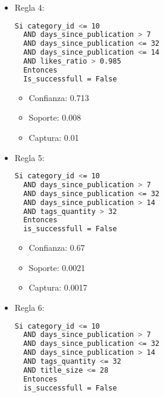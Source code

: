 \begin{itemize}

  \item Regla 4:

\begin{lstlisting}[language=bash, numbers=none]
  Si category_id <= 10
  AND days_since_publication > 7
  AND days_since_publication <= 32
  AND days_since_publication <= 14
  AND likes_ratio > 0.985
  Entonces
  Is_successfull = False
\end{lstlisting}

    \begin{itemize}
      \item Confianza: 0.713
      \item Soporte: 0.008
      \item Captura: 0.01
    \end{itemize}

  \item Regla 5:

\begin{lstlisting}[language=bash, numbers=none]
  Si category_id <= 10
  AND days_since_publication > 7
  AND days_since_publication <= 32
  AND days_since_publication > 14
  AND tags_quantity > 32
  Entonces
  is_successfull = False
\end{lstlisting}

    \begin{itemize}
      \item Confianza: 0.67
      \item Soporte: 0.0021
      \item Captura: 0.0017
    \end{itemize}

  \item Regla 6:

\begin{lstlisting}[language=bash, numbers=none]
  Si category_id <= 10
  AND days_since_publication > 7
  AND days_since_publication <= 32
  AND days_since_publication > 14
  AND tags_quantity <= 32
  AND title_size <= 28
  Entonces
  is_successfull = False
\end{lstlisting}


\end{itemize}
